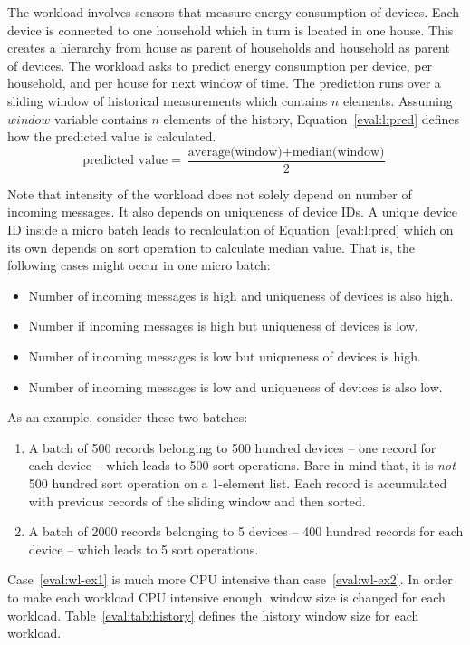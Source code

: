 The workload involves sensors that measure energy consumption of devices. Each device is connected to one household which in turn is located in one house. This creates a hierarchy from house as parent of households and household as parent of devices. The workload asks to predict energy consumption per device, per household, and per house  for next window of time. The prediction runs over a sliding window of historical measurements which contains $n$ elements. Assuming $window$ variable contains $n$ elements of the history, Equation~\ref{eval:l:pred} defines how the predicted value is calculated.
\begin{equation}
\text{predicted value} = \frac{\text{average(window)} + \text{median(window)}}{2}
\label{eval:l:pred}
\end{equation}

Note that intensity of the workload does not solely depend on number of incoming messages. It also depends on uniqueness of device IDs. A unique device ID inside a micro batch leads to recalculation of Equation~\ref{eval:l:pred} which on its own depends on sort operation to calculate median value. That is, the following cases might occur in one micro batch:
\begin{itemize}
    \item Number of incoming messages is high and uniqueness of devices is also high.
    \item Number if incoming messages is high but uniqueness of devices is low.
    \item Number of incoming messages is low but uniqueness of devices is high.
    \item Number of incoming messages is low and uniqueness of devices is also low.
\end{itemize}
As an example, consider these two batches:
\begin{enumerate}
    \item \label{eval:wl-ex1} A batch of 500 records belonging to 500 hundred devices -- one record for each device -- which leads to 500 sort operations. Bare in mind that, it is \emph{not} 500 hundred sort operation on a 1-element list. Each record is accumulated with previous records of the sliding window and then sorted.
    \item \label{eval:wl-ex2} A batch of 2000 records belonging to 5 devices -- 400 hundred records for each device -- which leads to 5 sort operations.
\end{enumerate}
Case~\ref{eval:wl-ex1} is much more CPU intensive than case~\ref{eval:wl-ex2}. In order to make each workload CPU intensive enough, window size is changed for each workload. Table~\ref{eval:tab:history} defines the history window size for each workload.
